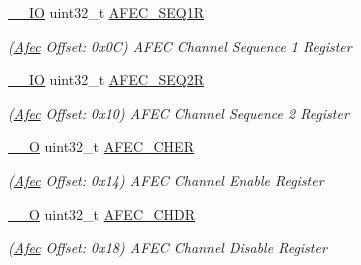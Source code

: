 \begin{DoxyCompactItemize}
\mbox{\label{structAfec_ade9a7257dcca6c8ab465a0976c215234}} 
\mbox{\hyperlink{core__cm7_8h_aec43007d9998a0a0e01faede4133d6be}{\+\_\+\+\_\+\+IO}} uint32\+\_\+t \mbox{\hyperlink{structAfec_ade9a7257dcca6c8ab465a0976c215234}{A\+F\+E\+C\+\_\+\+S\+E\+Q1R}}
\begin{DoxyCompactList}\small\item\em (\mbox{\hyperlink{structAfec}{Afec}} Offset\+: 0x0C) A\+F\+EC Channel Sequence 1 Register \end{DoxyCompactList}\item 
\mbox{\label{structAfec_a59f6c465fafe6bb642b597840f1fda53}} 
\mbox{\hyperlink{core__cm7_8h_aec43007d9998a0a0e01faede4133d6be}{\+\_\+\+\_\+\+IO}} uint32\+\_\+t \mbox{\hyperlink{structAfec_a59f6c465fafe6bb642b597840f1fda53}{A\+F\+E\+C\+\_\+\+S\+E\+Q2R}}
\begin{DoxyCompactList}\small\item\em (\mbox{\hyperlink{structAfec}{Afec}} Offset\+: 0x10) A\+F\+EC Channel Sequence 2 Register \end{DoxyCompactList}\item 
\mbox{\label{structAfec_abe97d9d9fd482bed00dbd9d974c1b843}} 
\mbox{\hyperlink{core__cm7_8h_a7e25d9380f9ef903923964322e71f2f6}{\+\_\+\+\_\+O}} uint32\+\_\+t \mbox{\hyperlink{structAfec_abe97d9d9fd482bed00dbd9d974c1b843}{A\+F\+E\+C\+\_\+\+C\+H\+ER}}
\begin{DoxyCompactList}\small\item\em (\mbox{\hyperlink{structAfec}{Afec}} Offset\+: 0x14) A\+F\+EC Channel Enable Register \end{DoxyCompactList}\item 
\mbox{\label{structAfec_a8be162885811f55a2221fa848bf0f16b}} 
\mbox{\hyperlink{core__cm7_8h_a7e25d9380f9ef903923964322e71f2f6}{\+\_\+\+\_\+O}} uint32\+\_\+t \mbox{\hyperlink{structAfec_a8be162885811f55a2221fa848bf0f16b}{A\+F\+E\+C\+\_\+\+C\+H\+DR}}
\begin{DoxyCompactList}\small\item\em (\mbox{\hyperlink{structAfec}{Afec}} Offset\+: 0x18) A\+F\+EC Channel Disable Register \end{DoxyCompactList}\item 
\mbox{\label{structAfec_a07aeeca355ca3abae0ee7195bd406555}} 

\end{DoxyCompactItemize}
